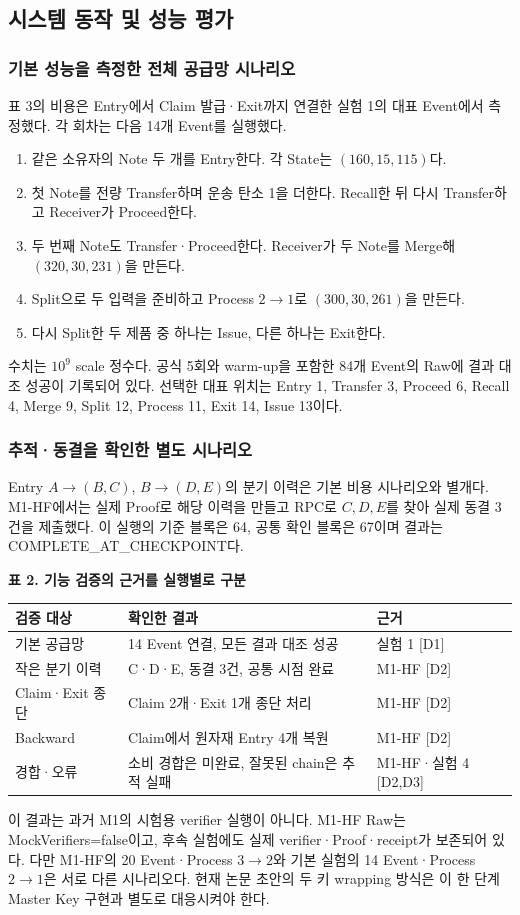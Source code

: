 \subsection{시스템 동작 및 성능 평가}
\subsubsection*{기본 성능을 측정한 전체 공급망 시나리오}
표 3의 비용은 Entry에서 Claim 발급·Exit까지 연결한 실험 1의 대표 Event에서 측정했다.
각 회차는 다음 14개 Event를 실행했다.
\begin{enumerate}
    \item 같은 소유자의 Note 두 개를 Entry한다. 각 State는 $(160,15,115)$다.
    \item 첫 Note를 전량 Transfer하며 운송 탄소 1을 더한다. Recall한 뒤 다시 Transfer하고 Receiver가 Proceed한다.
    \item 두 번째 Note도 Transfer·Proceed한다. Receiver가 두 Note를 Merge해 $(320,30,231)$을 만든다.
    \item Split으로 두 입력을 준비하고 Process $2\to1$로 $(300,30,261)$을 만든다.
    \item 다시 Split한 두 제품 중 하나는 Issue, 다른 하나는 Exit한다.
\end{enumerate}
수치는 $10^9$ scale 정수다. 공식 5회와 warm-up을 포함한 84개 Event의 Raw에 결과 대조 성공이 기록되어 있다.
선택한 대표 위치는 Entry 1, Transfer 3, Proceed 6, Recall 4, Merge 9, Split 12, Process 11, Exit 14, Issue 13이다.

\subsubsection*{추적·동결을 확인한 별도 시나리오}
Entry $A\to(B,C)$, $B\to(D,E)$의 분기 이력은 기본 비용 시나리오와 별개다.
M1-HF에서는 실제 Proof로 해당 이력을 만들고 RPC로 $C,D,E$를 찾아 실제 동결 3건을 제출했다.
이 실행의 기준 블록은 64, 공통 확인 블록은 67이며 결과는 COMPLETE\_AT\_CHECKPOINT다.
\begin{center}\small\setlength{\tabcolsep}{6pt}
    \textbf{표 2. 기능 검증의 근거를 실행별로 구분}\par\smallskip
    \begin{tabular}{@{}p{2.7cm}p{7cm}p{3.8cm}@{}}\toprule
        \textbf{검증 대상} & \textbf{확인한 결과}              & \textbf{근거}        \\ \midrule
        기본 공급망         & 14 Event 연결, 모든 결과 대조 성공     & 실험 1 [D1]          \\
        작은 분기 이력       & C·D·E, 동결 3건, 공통 시점 완료       & M1-HF [D2]         \\
        Claim·Exit 종단  & Claim 2개·Exit 1개 종단 처리       & M1-HF [D2]         \\
        Backward       & Claim에서 원자재 Entry 4개 복원      & M1-HF [D2]         \\
        경합·오류          & 소비 경합은 미완료, 잘못된 chain은 추적 실패 & M1-HF·실험 4 [D2,D3] \\
        \bottomrule\end{tabular}\end{center}

이 결과는 과거 M1의 시험용 verifier 실행이 아니다. M1-HF Raw는 MockVerifiers=false이고, 후속 실험에도 실제 verifier·Proof·receipt가 보존되어 있다.
다만 M1-HF의 20 Event·Process $3\to2$와 기본 실험의 14 Event·Process $2\to1$은 서로 다른 시나리오다.
현재 논문 초안의 두 키 wrapping 방식은 이 한 단계 Master Key 구현과 별도로 대응시켜야 한다.

